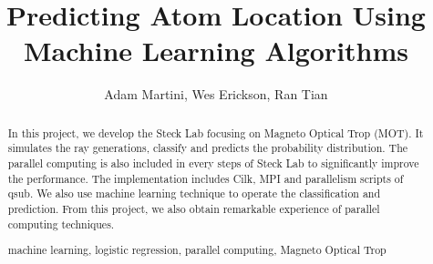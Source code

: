 \documentclass[runningheads,a4paper,11pt]{llncs}
\newcommand{\keywords}[1]{\par\addvspace\baselineskip
\noindent\keywordname\enspace\ignorespaces#1}
\begin{document}
\mainmatter  %

\title{Predicting Atom Location Using \\\vspace{.5em} Machine Learning Algorithms}


%
%
\author{Adam Martini, Wes Erickson, Ran Tian}


%
%

\maketitle

\begin{abstract} In this project, we develop the Steck Lab focusing on Magneto Optical Trop (MOT). It simulates the ray generations, classify and predicts the probability distribution. The parallel computing is also included in every steps of Steck Lab to significantly improve the performance. The implementation includes Cilk, MPI and parallelism scripts of qsub. We also use machine learning technique to operate the classification and prediction. From this project, we also obtain remarkable experience of parallel computing techniques. 
\keywords{machine learning, logistic regression, parallel computing, Magneto Optical Trop}
\end{abstract}

















\end{document}
